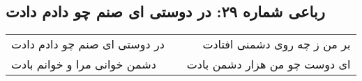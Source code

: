 \begin{center}
\section*{رباعی شماره ۲۹: در دوستی ای صنم چو دادم دادت}
\label{sec:sh029}
\begin{longtable}{l p{0.5cm} r}
در دوستی ای صنم چو دادم دادت
&&
بر من ز چه روی دشمنی افتادت
\\
دشمن خوانی مرا و خوانم بادت
&&
ای دوست چو من هزار دشمن بادت
\\
\end{longtable}
\end{center}
